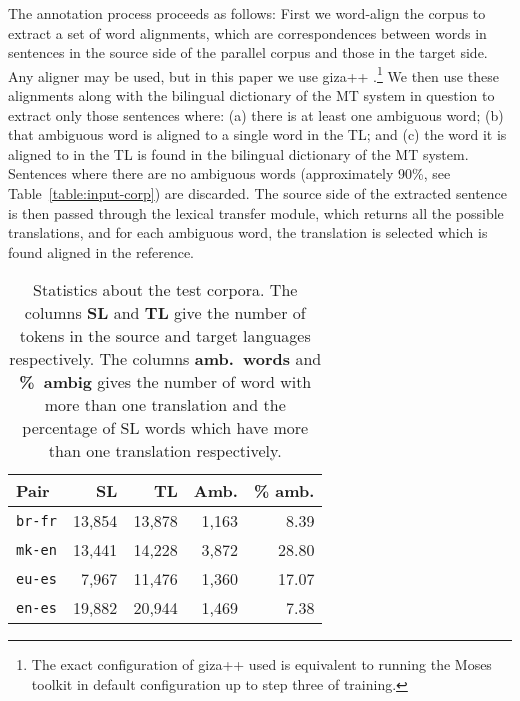 \documentclass[11pt]{article}
\begin{document}
The annotation process proceeds as follows: First we word-align the
corpus to extract a set of word alignments, which are correspondences
between words in sentences in the source side of the parallel corpus
and those in the target side. Any aligner may be used, but in this
paper we use {\sc giza++} \citep{och03a}.\footnote{The exact
  configuration of {\sc giza++} used is equivalent to running the {\sc
    Moses} toolkit \citep{koehn07} in default configuration up to step
  three of training.}  We then use these alignments along with the
bilingual dictionary of the MT system in question to extract only
those sentences where: (a) there is at least one ambiguous word; (b)
that ambiguous word is aligned to a single word in the TL; and (c) the
word it is aligned to in the TL is found in the bilingual dictionary
of the MT system. Sentences where there are no ambiguous words
(approximately 90\%, see Table~\ref{table:input-corp}) are
discarded. The source side of the extracted sentence is then passed
through the lexical transfer module, which returns all the possible
translations, and for each ambiguous word, the translation is selected
which is found aligned in the reference.

  \begin{table}
  \begin{center}
   \begin{tabular}{|l|r|r|r|r|}
      \hline 
      {\bf Pair}      & {\bf SL} & {\bf TL} & {\bf Amb.} & {\bf \% amb.} \\ 
      \hline 
       \texttt{br-fr} & 13,854  & 13,878  & 1,163 & 8.39   \\
      \hline 
       \texttt{mk-en} & 13,441 & 14,228  & 3,872 & 28.80 \\
      \hline 
       \texttt{eu-es} & 7,967 & 11,476  & 1,360  & 17.07 \\
      \hline 
       \texttt{en-es} & 19,882 & 20,944  & 1,469  & 7.38 \\
      \hline 
   \end{tabular} 
  \end{center}
   \caption{Statistics about the test corpora. The columns \textbf{SL} and \textbf{TL} give the number
      of tokens in the source and target languages respectively. The columns \textbf{amb.\ words} and \textbf{\%~ambig} gives 
      the number of word with more than one translation and the percentage of SL words which have 
      more than one translation respectively.}
    \label{table:test-corp}
  \end{table}
\end{document}
